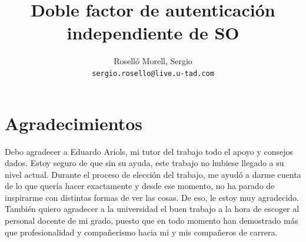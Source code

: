 \documentclass[titlepage, 12pt, a4paper]{article}
\title{Doble factor de autenticación independiente de SO}
\author{Roselló Morell, Sergio\\
\texttt{sergio.rosello@live.u-tad.com}}
\begin{document}
\afterpage{\restorepagecolor}
\maketitle
\tableofcontents
\clearpage
\section{Agradecimientos}
Debo agradecer a Eduardo Ariols, mi tutor del trabajo todo el apoyo y consejos dados. Estoy seguro de que sin su ayuda, este trabajo no hubiese llegado a su nivel actual. Durante el proceso de elección del trabajo, me ayudó a darme cuenta de lo que quería hacer exactamente y desde ese momento, no ha parado de inspirarme con distintas formas de ver las cosas. De eso, le estoy muy agradecido.\\También quiero agradecer a la universidad el buen trabajo a la hora de escoger al personal docente de mi grado, puesto que en todo momento han demostrado más que profesionalidad y compañerismo hacia mi y mis compañeros de carrera.
\clearpage
\end{document}
